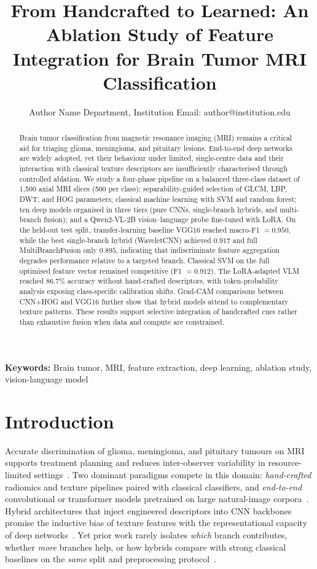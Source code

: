 \documentclass[11pt]{article}
\title{From Handcrafted to Learned: An Ablation Study of Feature Integration for Brain Tumor MRI Classification}
\author{Author Name Department, Institution Email: author@institution.edu}
\begin{document}
\maketitle

\begin{abstract}
Brain tumor classification from magnetic resonance imaging (MRI) remains a critical aid for triaging glioma, meningioma, and pituitary lesions.
End-to-end deep networks are widely adopted, yet their behaviour under limited, single-centre data and their interaction with classical texture descriptors are insufficiently characterised through controlled ablation.
We study a four-phase pipeline on a balanced three-class dataset of 1{,}500 axial MRI slices (500 per class): separability-guided selection of GLCM, LBP, DWT, and HOG parameters; classical machine learning with SVM and random forest; ten deep models organised in three tiers (pure CNNs, single-branch hybrids, and multi-branch fusion); and a Qwen2-VL-2B vision--language probe fine-tuned with LoRA.
On the held-out test split, transfer-learning baseline VGG16 reached macro-F1 $=0.950$, while the best single-branch hybrid (WaveletCNN) achieved $0.917$ and full MultiBranchFusion only $0.895$, indicating that indiscriminate feature aggregation degrades performance relative to a targeted branch.
Classical SVM on the full optimised feature vector remained competitive (F1 $=0.912$).
The LoRA-adapted VLM reached $86.7\%$ accuracy without hand-crafted descriptors, with token-probability analysis exposing class-specific calibration shifts.
Grad-CAM comparisons between CNN+HOG and VGG16 further show that hybrid models attend to complementary texture patterns.
These results support selective integration of handcrafted cues rather than exhaustive fusion when data and compute are constrained.
\end{abstract}

\noindent\textbf{Keywords:} Brain tumor, MRI, feature extraction, deep learning, ablation study, vision-language model

\bigskip

\section{Introduction}


Accurate discrimination of glioma, meningioma, and pituitary tumours on MRI supports treatment planning and reduces inter-observer variability in resource-limited settings~\cite{ref02_Brain2023}.
Two dominant paradigms compete in this domain: \emph{hand-crafted} radiomics and texture pipelines paired with classical classifiers, and \emph{end-to-end} convolutional or transformer models pretrained on large natural-image corpora~\cite{ref15_access20233242666,ref77_s40747-021-00563-x}.
Hybrid architectures that inject engineered descriptors into CNN backbones promise the inductive bias of texture features with the representational capacity of deep networks~\cite{ref61_jbspc2023104737,ref56_s41598-024-56657-3}.
Yet prior work rarely isolates \emph{which} branch contributes, whether \emph{more} branches help, or how hybrids compare with strong classical baselines on the \emph{same} split and preprocessing protocol~\cite{ref22_jcompbiomed2024108412}.
\end{document}
